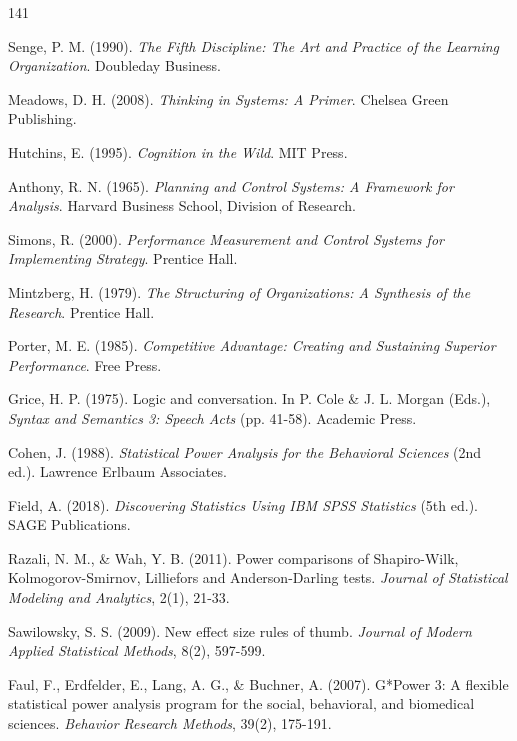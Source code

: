 \begin{thebibliography}{141}

Senge, P. M. (1990). \textit{The Fifth Discipline: The Art and Practice of the Learning Organization}. Doubleday Business.

Meadows, D. H. (2008). \textit{Thinking in Systems: A Primer}. Chelsea Green Publishing.

Hutchins, E. (1995). \textit{Cognition in the Wild}. MIT Press.

Anthony, R. N. (1965). \textit{Planning and Control Systems: A Framework for Analysis}. Harvard Business School, Division of Research.

Simons, R. (2000). \textit{Performance Measurement and Control Systems for Implementing Strategy}. Prentice Hall.

Mintzberg, H. (1979). \textit{The Structuring of Organizations: A Synthesis of the Research}. Prentice Hall.

Porter, M. E. (1985). \textit{Competitive Advantage: Creating and Sustaining Superior Performance}. Free Press.

Grice, H. P. (1975). Logic and conversation. In P. Cole \& J. L. Morgan (Eds.), \textit{Syntax and Semantics 3: Speech Acts} (pp. 41-58). Academic Press.


Cohen, J. (1988). \textit{Statistical Power Analysis for the Behavioral Sciences} (2nd ed.). Lawrence Erlbaum Associates.

Field, A. (2018). \textit{Discovering Statistics Using IBM SPSS Statistics} (5th ed.). SAGE Publications.

Razali, N. M., \& Wah, Y. B. (2011). Power comparisons of Shapiro-Wilk, Kolmogorov-Smirnov, Lilliefors and Anderson-Darling tests. \textit{Journal of Statistical Modeling and Analytics}, 2(1), 21-33.

Sawilowsky, S. S. (2009). New effect size rules of thumb. \textit{Journal of Modern Applied Statistical Methods}, 8(2), 597-599.

Faul, F., Erdfelder, E., Lang, A. G., \& Buchner, A. (2007). G*Power 3: A flexible statistical power analysis program for the social, behavioral, and biomedical sciences. \textit{Behavior Research Methods}, 39(2), 175-191.


\end{thebibliography}
